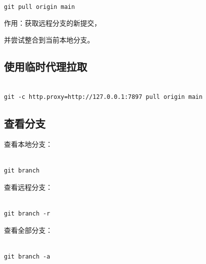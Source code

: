 \begin{lstlisting}

git pull origin main

\end{lstlisting}



作用：获取远程分支的新提交，

并尝试整合到当前本地分支。



\subsection{使用临时代理拉取}



\begin{lstlisting}

git -c http.proxy=http://127.0.0.1:7897 pull origin main

\end{lstlisting}



\subsection{查看分支}



查看本地分支：



\begin{lstlisting}

git branch

\end{lstlisting}



查看远程分支：



\begin{lstlisting}

git branch -r

\end{lstlisting}



查看全部分支：



\begin{lstlisting}

git branch -a

\end{lstlisting}






